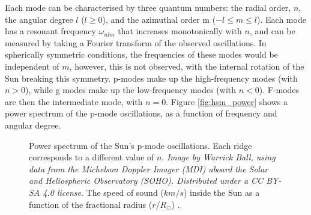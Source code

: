 \documentclass[11pt,a4paper,onecolumn]{report}
\begin{document}
Each mode can be characterised by three quantum numbers: the radial order,
\(n\), the angular degree \(l\) (\(l \geq 0\)), and the azimuthal order m (\(-l
\leq m \leq l\)). Each mode has a resonant frequency \(\omega_{nlm}\) that
increases monotonically with \(n\), and can be measured by taking a Fourier
transform of the observed oscillations. In spherically symmetric conditions, the
frequencies of these modes would be independent of \(m\), however, this is not
observed, with the internal rotation of the Sun breaking this symmetry. p-modes
make up the high-frequency modes (with \(n>0\)), while g modes make up the
low-frequency modes (with \(n<0\)). F-modes are then the intermediate mode, with
\(n=0\). Figure \ref{fig:hsm_power} shows a power spectrum of the p-mode
oscillations, as a function of frequency and angular degree. \\

\begin{figure}[t]
  \centering
   \caption{ Power spectrum of the Sun's p-mode
  oscillations. Each ridge corresponds to a different value of \(n\).
  \textit{Image by Warrick Ball, using data from the Michelson Doppler Imager
  (MDI) aboard the Solar and Heliospheric Observatory (SOHO). Distributed under
  a CC BY-SA 4.0 license}.  The speed of sound
  (\(\si{km\per s}\)) inside the Sun as a function of the fractional radius
  (\(\si{r \per R_\odot}\)) \citep{bahcall_solar_2000}.}

\end{figure}
\end{document}
